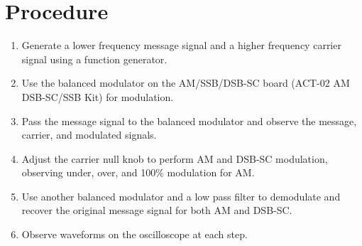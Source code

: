 \documentclass[12pt]{article}
\begin{document}
\section*{Procedure}
\begin{enumerate}
    \item Generate a lower frequency message signal and a higher frequency carrier signal using a function generator.
    \item Use the balanced modulator on the AM/SSB/DSB-SC board (ACT-02 AM DSB-SC/SSB Kit) for modulation.
    \item Pass the message signal to the balanced modulator and observe the message, carrier, and modulated signals.
    \item Adjust the carrier null knob to perform AM and DSB-SC modulation, observing under, over, and 100\% modulation for AM.
    \item Use another balanced modulator and a low pass filter to demodulate and recover the original message signal for both AM and DSB-SC.
    \item Observe waveforms on the oscilloscope at each step.
\end{enumerate}
\end{document}
